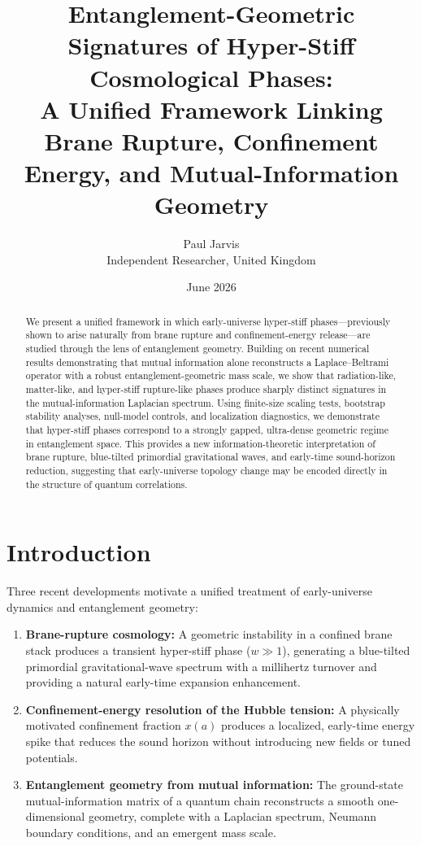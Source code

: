 \documentclass[11pt]{article}
\title{\textbf{Entanglement-Geometric Signatures of Hyper-Stiff Cosmological Phases:\\
A Unified Framework Linking Brane Rupture, Confinement Energy, and Mutual-Information Geometry}}
\author{Paul Jarvis \\ Independent Researcher, United Kingdom}
\date{June 2026}
\begin{document}
\maketitle

\begin{abstract}
We present a unified framework in which early-universe hyper-stiff phases---previously shown to arise naturally from brane rupture and confinement-energy release---are studied through the lens of entanglement geometry. Building on recent numerical results demonstrating that mutual information alone reconstructs a Laplace--Beltrami operator with a robust entanglement-geometric mass scale, we show that radiation-like, matter-like, and hyper-stiff rupture-like phases produce sharply distinct signatures in the mutual-information Laplacian spectrum. Using finite-size scaling tests, bootstrap stability analyses, null-model controls, and localization diagnostics, we demonstrate that hyper-stiff phases correspond to a strongly gapped, ultra-dense geometric regime in entanglement space. This provides a new information-theoretic interpretation of brane rupture, blue-tilted primordial gravitational waves, and early-time sound-horizon reduction, suggesting that early-universe topology change may be encoded directly in the structure of quantum correlations.
\end{abstract}

\section{Introduction}

Three recent developments motivate a unified treatment of early-universe dynamics and entanglement geometry:

\begin{enumerate}
    \item \textbf{Brane-rupture cosmology:}  
    A geometric instability in a confined brane stack produces a transient hyper-stiff phase ($w \gg 1$), generating a blue-tilted primordial gravitational-wave spectrum with a millihertz turnover and providing a natural early-time expansion enhancement.

    \item \textbf{Confinement-energy resolution of the Hubble tension:}  
    A physically motivated confinement fraction $x(a)$ produces a localized, early-time energy spike that reduces the sound horizon without introducing new fields or tuned potentials.

    \item \textbf{Entanglement geometry from mutual information:}  
    The ground-state mutual-information matrix of a quantum chain reconstructs a smooth one-dimensional geometry, complete with a Laplacian spectrum, Neumann boundary conditions, and an emergent mass scale.
\end{enumerate}
\end{document}
